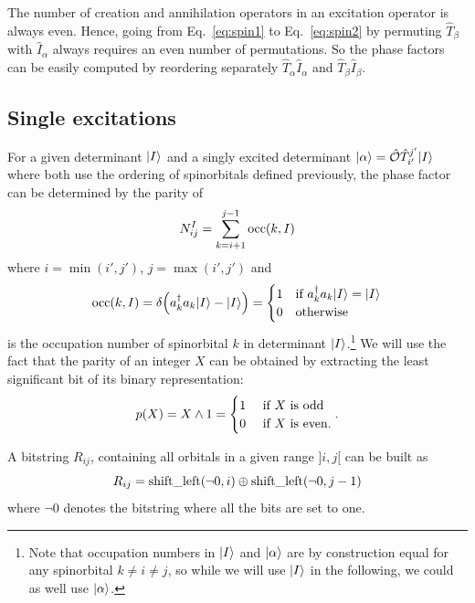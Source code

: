\documentclass[./thesis.tex]{subfiles}
\begin{document}
The number of creation and annihilation operators in an excitation operator is always even. Hence, going from Eq.~\eqref{eq:spin1} to Eq.~\eqref{eq:spin2} by permuting $\hat{T}_\beta$ with $\hat{I}_\alpha$ always requires an even number of permutations.
So the phase factors can be easily computed by reordering separately $\hat{T}_\alpha \hat{I}_\alpha$ and $\hat{T}_\beta  \hat{I}_\beta$.



\subsection{Single excitations}


For a given determinant ${\ket{I}}$ and a singly excited determinant ${\ket{\alpha}} = {\hat{\mathcal{O}}} {\hat{T}_{i'}^{j'}} {\ket{I}}$ where both 
use the ordering of spinorbitals defined previously, the phase factor can be determined by the parity of
\begin{equation}
N^{I}_{ij}=\sum_{k=i+1}^{j-1} {\text{occ}(k,I)}
\end{equation}
where $i=\min(i',j')$, $j=\max(i',j')$ and
\begin{equation}
{\text{occ}(k,I)} = \delta \qty(a^\dagger_{k}a_{k} {\ket{I}} - {\ket{I}}) = \begin{cases}
 1 & \text{if } a^\dagger_{k}a_{k} {\ket{I}} = {\ket{I}} \\
 0 & \text{otherwise}
\end{cases}
\end{equation}
is the occupation number of spinorbital $k$ in determinant ${\ket{I}}$.\footnote{Note that occupation
numbers in ${\ket{I}}$ and ${\ket{\alpha}}$ are by construction equal for any spinorbital $k \neq i \neq j$, so while we will use ${\ket{I}}$ in the following, we could as well use ${\ket{\alpha}}$.
}
We will use the fact that the parity of an integer $X$ can be obtained by extracting the least significant bit of its binary representation: 
\begin{equation}
p(X)=X \wedge 1 = \begin{cases}
1 & \text{ if $X$ is odd  } \\
0 & \text{ if $X$ is even.} 
\end{cases}.
\end{equation}


A bitstring $R_{ij}$, containing all orbitals in a given range $]i, j[$ can be built as 
\begin{equation}
R_{ij}=\text{shift\_left}(\neg{0},i) \oplus \text{shift\_left}(\neg{0},j-1)
\end{equation}
where $\neg{0}$ denotes the bitstring where all the bits are set to one.
\end{document}
